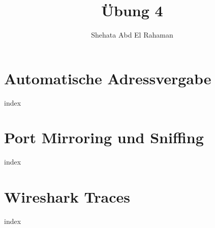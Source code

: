 \documentclass[12pt,letterpaper]{article}
\title{\"Ubung 4}
\author{Shehata Abd El Rahaman}
\date{}
\begin{document}
\maketitle

\tableofcontents

\clearpage
\pagebreak
\section{Automatische Adressvergabe}
{index}
\clearpage
\pagebreak
\section{Port Mirroring und Sniffing}
{index}
\clearpage
\pagebreak
\section{Wireshark Traces}
{index}
\end{document}
